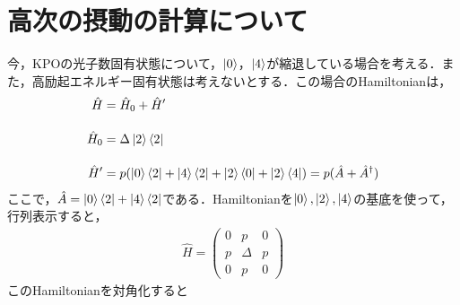 





\section{高次の摂動の計算について}
今，KPOの光子数固有状態について，$\ket{0}$，$\ket{4}$が縮退している場合を考える．また，高励起エネルギー固有状態は考えないとする．この場合のHamiltonianは，
\begin{align}
    \hat{H} &= \hat{H}_0 + \hat{H}^{\prime}\\[10pt]
    \hat{H}_0 &= \Delta \ket{2}\bra{2}\nn[10pt]
    \hat{H}^{\prime} &
    = p(\ket{0}\bra{2} + \ket{4}\bra{2} + \ket{2}\bra{0} + \ket{2}\bra{4})
    = p(\hat{A} + \hat{A}^{\dagger})
\end{align}
ここで，$\hat{A} = \ket{0}\bra{2} + \ket{4}\bra{2}$である．Hamiltonianを$\ket{0}, \ket{2}, \ket{4}$の基底を使って，行列表示すると，
\begin{align}
    \hat{H}=
    \left(
    \begin{array}{ccc}
    0 & p & 0 \\[5pt]
    p & \Delta & p \\[5pt]
    0 & p & 0
    \end{array}
    \right)
\end{align}
このHamiltonianを対角化すると



